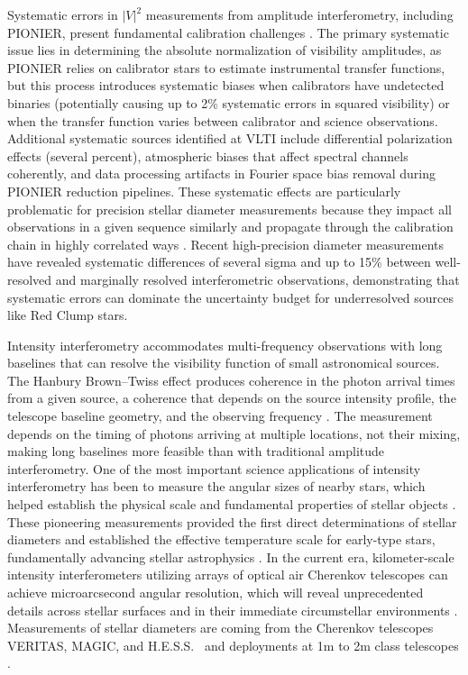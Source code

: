 \documentclass[linenumbers,trackchanges,margins]{aastex701}
\begin{document}
Systematic errors in $|V|^2$ measurements from amplitude interferometry, including PIONIER, present fundamental calibration challenges \citep{10.1093/mnras/stz114}. The primary systematic issue lies in determining the absolute normalization of visibility amplitudes, as PIONIER relies on calibrator stars to estimate instrumental transfer functions, but this process introduces systematic biases when calibrators have undetected binaries (potentially causing up to 2\% systematic errors in squared visibility) or when the transfer function varies between calibrator and science observations. Additional systematic sources identified at VLTI include differential polarization effects (several percent), atmospheric biases that affect spectral channels coherently, and data processing artifacts in Fourier space bias removal during PIONIER reduction pipelines. These systematic effects are particularly problematic for precision stellar diameter measurements because they impact all observations in a given sequence similarly and propagate through the calibration chain in highly correlated ways \citep{10.1093/mnras/stz114}. Recent high-precision diameter measurements have revealed systematic differences of several sigma and up to 15\% between well-resolved and marginally resolved interferometric observations, demonstrating that systematic errors can dominate the uncertainty budget for underresolved sources like Red Clump stars.

Intensity interferometry accommodates multi-frequency observations with long baselines that can resolve the visibility function of small astronomical sources. The Hanbury Brown--Twiss effect produces coherence in the photon arrival times from a given source, a coherence that depends on the source intensity profile, the telescope baseline geometry, and the observing frequency \citep{1956Natur.177...27B, 1956Natur.178.1046H}. The measurement depends on the timing of photons arriving at multiple locations, not their mixing, making long baselines more feasible than with traditional amplitude interferometry.
One of the most important science applications of intensity interferometry has been to measure the angular sizes of nearby stars, which helped establish the physical scale and fundamental properties of stellar objects \citep{1967MNRAS.137..393H, 1974MNRAS.167..121H}. These pioneering measurements provided the first direct determinations of stellar diameters and established the effective temperature scale for early-type stars, fundamentally advancing stellar astrophysics \citep{1976ApJ...203..417C}.
In the current era, kilometer-scale intensity interferometers utilizing arrays of optical air Cherenkov telescopes can achieve microarcsecond angular resolution, which will reveal unprecedented details across stellar surfaces and in their immediate circumstellar environments \citep{2012MNRAS.419..172N, 2016SPIE.9907E..0MD}.
Measurements of stellar diameters are coming from the
Cherenkov telescopes VERITAS,
MAGIC, and H.E.S.S.\ 
\cite{2020MNRAS.491.1540A, 2024MNRAS.52712243Z, 10.1093/mnras/stae2643,  2024ApJ...966...28A, 10.1093/mnras/stae2643}
and deployments at 1m to 2m class telescopes
\cite{2021MNRAS.506.1585Z, 2023AJ....165..117M}.
\end{document}
